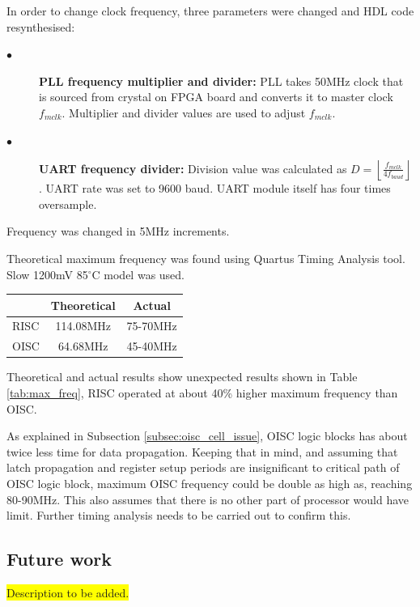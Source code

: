 In order to change clock frequency, three parameters were changed and HDL code resynthesised: 
\begin{description}
	\item[$\bullet$] \textbf{PLL frequency multiplier and divider:}
	PLL takes 50MHz clock that is sourced from crystal on FPGA board and converts it to master clock $f_{mclk}$. Multiplier and divider values are used to adjust $f_{mclk}$.
	
	\item[$\bullet$] \textbf{UART frequency divider:}
	Division value was calculated as $D = \left \lfloor \frac{f_{mclk}}{4 f_{baud}} \right \rfloor$. UART rate was set to 9600 baud. UART module itself has four times oversample. 
\end{description}
Frequency was changed in 5MHz increments. 

Theoretical maximum frequency was found using Quartus Timing Analysis tool. Slow 1200mV 85$^{\circ}$C model was used. 

\begin{center}
	\begin{tabular}{ l | c | c  }
		     & Theoretical & Actual \\ \hline
		RISC & 114.08MHz & 75-70MHz \\ \hline
		OISC & 64.68MHz & 45-40MHz \\
	\end{tabular}
	\label{tab:max_freq}
\end{center}

Theoretical and actual results show unexpected results shown in Table \ref{tab:max_freq}, RISC operated at about 40\% higher maximum frequency than OISC.

As explained in Subsection \ref{subsec:oisc_cell_issue}, OISC logic blocks has about twice less time for data propagation. Keeping that in mind, and assuming that latch propagation and register setup periods are insignificant to critical path of OISC logic block, maximum OISC frequency could be double as high as, reaching 80-90MHz. This also assumes that there is no other part of processor would have limit. Further timing analysis needs to be carried out to confirm this.

\subsection{Future work}
\colorbox{yellow}{Description to be added.}

